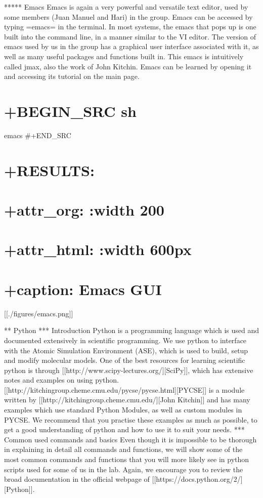 \documentclass[11pt]{article}
\begin{document}
***** Emacs Emacs is again a very powerful and versatile text editor,
used by some members (Juan Manuel and Hari) in the group. Emacs can be
accessed by typing =emacs= in the terminal. In most systems, the emacs
that pops up is one built into the command line, in a manner similar to
the VI editor. The version of emacs used by us in the group has a
graphical user interface associated with it, as well as many useful
packages and functions built in. This emacs is intuitively called jmax,
also the work of John Kitchin. Emacs can be learned by opening it and
accessing its tutorial on the main page.

\section{+BEGIN\_SRC sh}\label{begin_src-sh}

emacs \#+END\_SRC

\section{+RESULTS:}\label{results-5}

\section{+attr\_org: :width 200}\label{attr_org-width-200}

\section{+attr\_html: :width 600px}\label{attr_html-width-600px}

\section{+caption: Emacs GUI}\label{caption-emacs-gui}

{[}{[}./figures/emacs.png{]}{]}

** Python *** Introduction Python is a programming language which is
used and documented extensively in scientific programming. We use python
to interface with the Atomic Simulation Environment (ASE), which is used
to build, setup and modify molecular models. One of the best resources
for learning scientific python is through
{[}{[}http://www.scipy-lectures.org/{]}{[}SciPy{]}{]}, which has
extensive notes and examples on using python.
{[}{[}http://kitchingroup.cheme.cmu.edu/pycse/pycse.html{]}{[}PYCSE{]}{]}
is a module written by
{[}{[}http://kitchingroup.cheme.cmu.edu/{]}{[}John Kitchin{]}{]} and has
many examples which use standard Python Modules, as well as custom
modules in PYCSE. We recommend that you practise these examples as much
as possible, to get a good understanding of python and how to use it to
suit your needs. *** Common used commands and basics Even though it is
impossible to be thorough in explaining in detail all commands and
functions, we will show some of the most common commands and functions
that you will more likely see in python scripts used for some of us in
the lab. Again, we encourage you to review the broad documentation in
the official webpage of
{[}{[}https://docs.python.org/2/{]}{[}Python{]}{]}.
\end{document}
